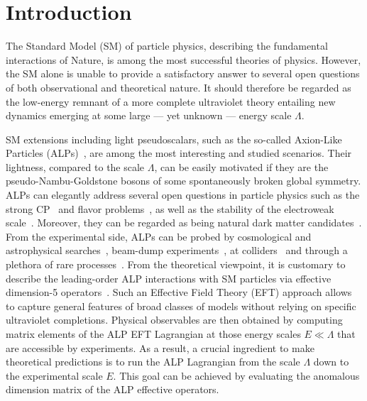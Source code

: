 \section{\label{sec:intro}Introduction}

The Standard Model (SM) of particle physics, describing the fundamental interactions of Nature, is among the most successful theories of physics.
However, the SM alone is unable to provide a satisfactory answer to several open questions of both observational and theoretical nature. 
It should therefore be regarded as the low-energy remnant of a more complete ultraviolet theory entailing new dynamics emerging at some large 
--- yet unknown --- energy scale $\Lambda$.

SM extensions including light pseudoscalars, such as the so-called 
Axion-Like Particles (ALPs)~\cite{Jaeckel:2010ni,Marsh:2015xka,Irastorza:2018dyq,DiLuzio:2020wdo}, 
are among the most interesting and studied scenarios.
Their lightness, compared to the scale $\Lambda$, can be easily motivated if 
they are the pseudo-Nambu-Goldstone bosons of some spontaneously broken global symmetry.
ALPs can elegantly address several open questions in particle physics such as the strong CP~\cite{Peccei:1977hh,Peccei:1977ur,Weinberg:1977ma,Wilczek:1977pj} and flavor problems~\cite{Davidson:1981zd,Wilczek:1982rv,Berezhiani:1989fp,Calibbi:2016hwq,Greljo:2024evt}, as well as the stability of the electroweak scale~\cite{Graham:2015cka}. 
Moreover, they can be regarded as being natural dark matter candidates~\cite{Abbott:1982af,Preskill:1982cy,Dine:1982ah,Davis:1986xc}. 
From the experimental side, ALPs can be probed by cosmological and astrophysical  searches~\cite{ADMX:2003rdr,Barbieri:2016vwg,Caldwell:2016dcw,Zioutas:1998cc,Irastorza:2011gs,CAST:2017uph,Armengaud:2014gea,VanBibber:1987rq,Bahre:2013ywa,OSQAR:2015qdv,Arvanitaki:2014dfa}, beam-dump experiments~\cite{Alekhin:2015byh,Dobrich:2015jyk,Shan:2024pcc}, 
at colliders~\cite{Bauer:2017ris,Brivio:2017ije} and through a plethora of rare processes~\cite{Bauer:2021mvw,Gavela:2019wzg,Cornella:2019uxs}.
From the theoretical viewpoint, it is customary to describe the leading-order ALP interactions with SM particles via effective dimension-5 operators~\cite{Georgi:1986df}. Such an Effective Field Theory (EFT) approach allows to capture general features of broad classes of models without relying on specific ultraviolet completions. 
Physical observables are then obtained by computing matrix elements of the ALP EFT Lagrangian at those energy scales $E \ll \Lambda$ that are accessible by experiments. 
As a result, a crucial ingredient to make theoretical predictions is to run the ALP Lagrangian from the scale $\Lambda$ down to the experimental scale $E$.
This goal can be achieved by evaluating the anomalous dimension matrix of the ALP effective operators.

